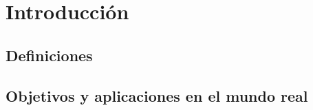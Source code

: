 \chapter{Introducción}
\section{Definiciones}


\section{Objetivos y aplicaciones en el mundo real}
